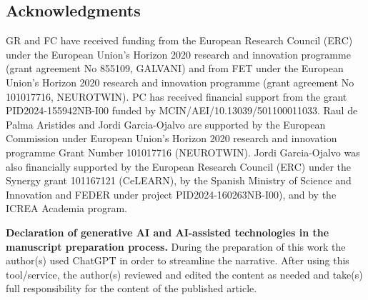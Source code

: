 \documentclass[12pt]{article}
\numberwithin{equation}{section}
\begin{document}

 \subsection*{Acknowledgments}
GR and FC have received funding from the European Research Council (ERC) under the European Union’s Horizon 2020 research and innovation programme (grant agreement No 855109, GALVANI) and from FET under the European Union’s Horizon 2020 research and innovation programme (grant agreement No 101017716, NEUROTWIN). 
PC has received financial support from the grant PID2024-155942NB-I00 funded by MCIN/AEI/10.13039/501100011033.
Raul de Palma Aristides and Jordi Garcia-Ojalvo are supported by the European Commission under European Union’s Horizon 2020 research and innovation programme Grant Number 101017716 (NEUROTWIN). Jordi Garcia-Ojalvo was also financially supported by the European Research Council (ERC) under the Synergy grant 101167121 (CeLEARN), by the Spanish Ministry of Science and Innovation and FEDER under project PID2024-160263NB-I00), and by the ICREA Academia program.

\textbf{Declaration of generative AI and AI-assisted technologies in the manuscript preparation process.}
During the preparation of this work the author(s) used ChatGPT in order to streamline the narrative. After using this tool/service, the author(s) reviewed and edited the content as needed and take(s) full responsibility for the content of the published article.



\clearpage


\end{document}
